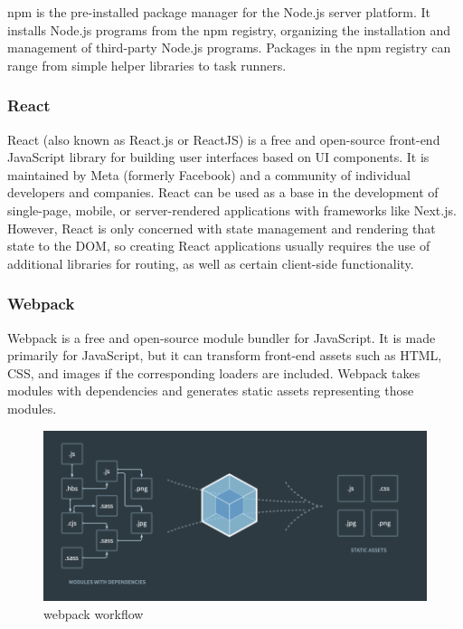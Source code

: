 npm is the pre-installed package manager for the Node.js server platform. It installs Node.js programs from the npm registry, organizing the installation and management of third-party Node.js programs. Packages in the npm registry can range from simple helper libraries to task runners.

\subsubsection {React}

React (also known as React.js or ReactJS) is a free and open-source front-end JavaScript library for building user interfaces based on UI components. It is maintained by Meta (formerly Facebook) and a community of individual developers and companies. React can be used as a base in the development of single-page, mobile, or server-rendered applications with frameworks like Next.js. However, React is only concerned with state management and rendering that state to the DOM, so creating React applications usually requires the use of additional libraries for routing, as well as certain client-side functionality.

\subsubsection {Webpack}

Webpack is a free and open-source module bundler for JavaScript. It is made primarily for JavaScript, but it can transform front-end assets such as HTML, CSS, and images if the corresponding loaders are included. Webpack takes modules with dependencies and generates static assets representing those modules.

\begin{figure}[h!]
    \vspace{0.5cm}
    \includegraphics[width=\textwidth]{images/extension/webpack-bundle.png}
    \caption{webpack workflow}
    \label{fig:webpack-bundle} %
\end{figure}

